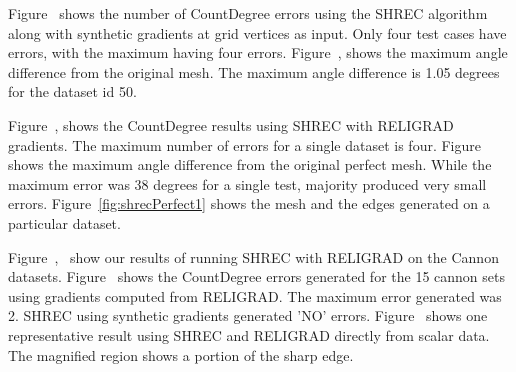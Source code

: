 Figure~\protect{} shows the number of CountDegree errors using the SHREC algorithm along with synthetic gradients at grid vertices as input. Only four test cases have errors, with the maximum having four errors. 
Figure~\protect{}, shows the maximum angle difference from the original mesh. The maximum angle difference is 1.05 degrees for the dataset id 50.

Figure~\protect{}, shows the CountDegree results using SHREC with RELIGRAD gradients. The maximum number of errors for a single dataset is four. Figure~\protect{} shows the maximum angle difference from the original perfect mesh. While the maximum error was 38 degrees for a single test, majority produced very small errors. Figure~\ref{fig:shrecPerfect1} shows the mesh and the edges generated on a particular dataset.

Figure~\protect{},~\protect{} show our results of running SHREC with RELIGRAD on the Cannon datasets. Figure~\protect{} shows the CountDegree errors generated for the 15 cannon sets using gradients computed from RELIGRAD. The maximum error generated was 2. SHREC using synthetic gradients generated 'NO' errors. Figure~\protect{} shows one representative result using SHREC and RELIGRAD directly from scalar data. The magnified region shows a portion of the sharp edge. 

